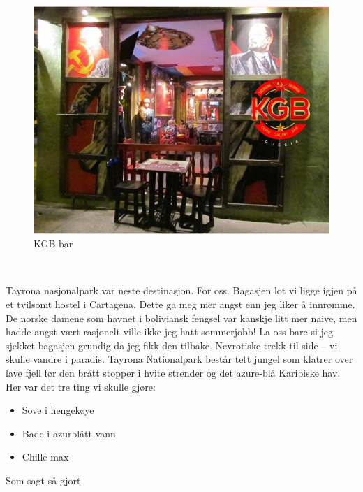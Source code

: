 \begin{figure}[!h]
	\centering
	\includegraphics[width=\textwidth]{kgbbar}
	\caption*{KGB-bar}
	\label{fig:kgbbar}
\end{figure}\\
\clearpage

Tayrona nasjonalpark var neste destinasjon. For oss. Bagasjen lot vi
ligge igjen på et tvilsomt hostel i Cartagena. Dette ga meg mer angst
enn jeg liker å innrømme. De norske damene som havnet i boliviansk
fengsel var kanskje litt
mer naive, men hadde angst vært rasjonelt ville ikke jeg
hatt sommerjobb! La oss bare si jeg sjekket bagasjen
grundig da jeg fikk den tilbake. Nevrotiske trekk til side -- vi
skulle vandre i paradis. Tayrona Nationalpark består tett jungel som
klatrer over lave fjell før den brått stopper i hvite strender og det
azure-blå Karibiske hav. Her var det tre ting vi skulle gjøre:

\begin{itemize}
	\item Sove i hengekøye
	\item Bade i azurblått vann
	\item Chille max
\end{itemize}

Som sagt så gjort.

